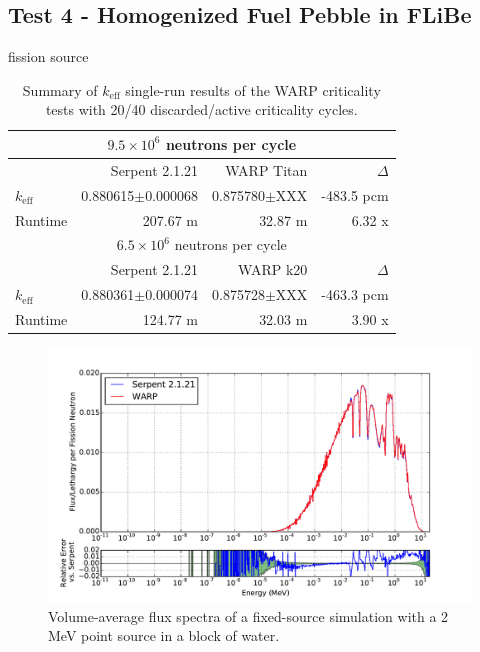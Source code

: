 \documentclass[preprint,12pt]{elsarticle}
\begin{document}
\subsection{Test 4 - Homogenized Fuel Pebble in FLiBe}

fission source

\begin{table}[h]
\centering
\caption{Summary of $k_\mathrm{eff}$ single-run results of the WARP criticality tests with 20/40 discarded/active criticality cycles.}
\label{flibe_table}
\small
\begin{tabular}{| l | r | r | r |}
\hline
\multicolumn{4}{|c|}{$9.5\times10^6$ neutrons per cycle} \\
\hline
                  & Serpent 2.1.21        & WARP Titan               & $\Delta$ \\
\hline
$k_\mathrm{eff}$  & 0.880615$\pm$0.000068 & 0.875780$\pm$XXX         & -483.5 pcm \\
\hline
Runtime           & 207.67 m              & 32.87 m                  & 6.32 x \\
\hline
\hline
\multicolumn{4}{|c|}{$6.5\times10^6$ neutrons per cycle} \\
\hline
                  & Serpent 2.1.21        & WARP k20            & $\Delta$ \\
\hline
$k_\mathrm{eff}$  & 0.880361$\pm$0.000074 & 0.875728$\pm$XXX    & -463.3 pcm \\
\hline
Runtime           & 124.77 m              & 32.03 m             & 3.90 x\\
\hline
\end{tabular}
\end{table}


\begin{figure}[h!]
\centering
\includegraphics[width=\textwidth,trim= 1cm 0cm 1cm 0cm]{graphics/flibe_spec.pdf}
\caption{Volume-average flux spectra of a fixed-source simulation with a 2 MeV point source in a block of water. \label{flibe_spec} }
\end{figure}
\end{document}
